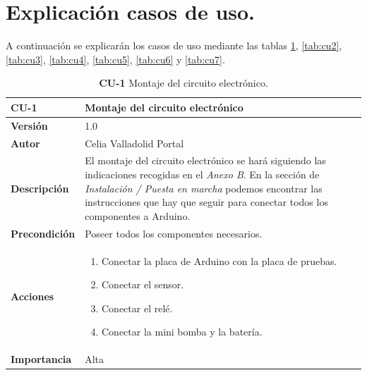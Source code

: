 \section{Explicación casos de uso.}

A continuación se explicarán los casos de uso mediante las tablas \ref{tab:cu1}, \ref{tab:cu2}, \ref{tab:cu3}, \ref{tab:cu4}, \ref{tab:cu5}, \ref{tab:cu6} y \ref{tab:cu7}.


\begin{table}[H]
	\centering
	\begin{tabularx}{\linewidth}{ p{} p{} }
		\toprule
            \rowcolor[HTML]{B0E0E6} 
		  \textbf{CU-1}    & \textbf{Montaje del circuito electrónico}\\
		\toprule
		\textbf{Versión}              & 1.0    \\
		\textbf{Autor}                & Celia Valladolid Portal \\
		\textbf{Descripción}          & El montaje del circuito electrónico se hará siguiendo las indicaciones recogidas en el \textit{Anexo B}. En la sección de \textit{Instalación / Puesta en marcha} podemos encontrar las instrucciones que hay que seguir para conectar todos los componentes a Arduino. \\
		\textbf{Precondición}         & Poseer todos los componentes necesarios. \\
		\textbf{Acciones}             &
		\begin{enumerate}
			\def\labelenumi{\arabic{enumi}.}
			\tightlist
                \item Conectar la placa de Arduino con la placa de pruebas.
			\item Conectar el sensor.
			\item Conectar el relé.
                \item Conectar la mini bomba y la batería.
		\end{enumerate}\\
		\textbf{Importancia}          & Alta  \\
		\bottomrule
	\end{tabularx}
	\caption{\textbf{CU-1} Montaje del circuito electrónico.}
        \label{tab:cu1}
\end{table}

